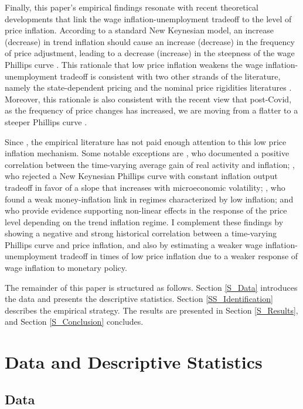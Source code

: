 \documentclass[12pt]{article}
\begin{document}
Finally, this paper's empirical findings resonate with recent theoretical developments that link the wage inflation-unemployment tradeoff to the level of price inflation. According to a standard New Keynesian model, an increase (decrease) in trend inflation should cause an increase (decrease) in the frequency of price adjustment, leading to a decrease (increase) in the steepness of the wage Phillips curve \citep{Benati2007}. This rationale that low price inflation weakens the wage inflation-unemployment tradeoff is consistent with two other strands of the literature, namely the state-dependent pricing \citep{Alvarez2019, Costain2022} and the nominal price rigidities literatures \citep{Tobin1972, Benigno2011, Daly2014}. Moreover, this rationale is also consistent with the recent view that post-Covid, as the frequency of price changes has increased, we are moving from a flatter to a steeper Phillips curve \citep{Waller2023}.

Since \cite{Ball1988}, the empirical literature has not paid enough attention to this low price inflation mechanism. Some notable exceptions are \cite{Benati2007}, who documented a positive correlation between the time-varying average gain of real activity and inflation; \cite{Vavra2014B}, who rejected a New Keynesian Phillips curve with constant inflation output tradeoff in favor of a slope that increases with microeconomic volatility; \cite{Gertler2018}, who found a weak money-inflation link in regimes characterized by low inflation; and \cite{Ascari2021, Ascari2022} who provide evidence supporting non-linear effects in the response of the price level depending on the trend inflation regime. I complement these findings by showing a negative and strong historical correlation between a time-varying Phillips curve and price inflation, and also by estimating a weaker wage inflation-unemployment tradeoff in times of low price inflation due to a weaker response of wage inflation to monetary policy.

The remainder of this paper is structured as follows. Section \ref{S_Data} introduces the data and presents the descriptive statistics. Section \ref{SS_Identification} describes the empirical strategy. The results are presented in Section \ref{S_Results}, and Section \ref{S_Conclusion} concludes.


\section{Data and Descriptive Statistics \label{S_Data}}
\subsection{Data}
\end{document}
